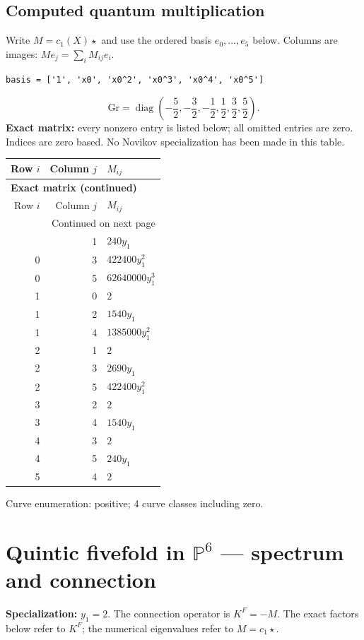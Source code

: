 \documentclass[10pt,a4paper]{article}
\begin{document}
\subsection*{Computed quantum multiplication}
Write $M=c_1(X)\star$ and use the ordered basis $e_0,\ldots,e_{5}$ below. Columns are images: $M e_j=\sum_i M_{ij}e_i$.
\begin{lstlisting}
basis = ['1', 'x0', 'x0^2', 'x0^3', 'x0^4', 'x0^5']
\end{lstlisting}
\[\mathrm{Gr}=\operatorname{diag}\!\left(- \frac{5}{2},- \frac{3}{2},- \frac{1}{2},\frac{1}{2},\frac{3}{2},\frac{5}{2}\right).\]
\textbf{Exact matrix:} every nonzero entry is listed below; all omitted entries are zero. Indices are zero based. No Novikov specialization has been made in this table.
{\small\setlength{\tabcolsep}{7pt}\begin{longtable}{rrp{125mm}}
\toprule Row $i$ & Column $j$ & $M_{ij}$\\\midrule\endfirsthead
\multicolumn{3}{l}{\textbf{Exact matrix (continued)}}\\
\toprule Row $i$ & Column $j$ & $M_{ij}$\\\midrule\endhead
\midrule\multicolumn{3}{r}{Continued on next page}\\\endfoot\bottomrule\endlastfoot
0 & 1 & $240 y_{1}$\\
0 & 3 & $422400 y_{1}^{2}$\\
0 & 5 & $62640000 y_{1}^{3}$\\
1 & 0 & $2$\\
1 & 2 & $1540 y_{1}$\\
1 & 4 & $1385000 y_{1}^{2}$\\
2 & 1 & $2$\\
2 & 3 & $2690 y_{1}$\\
2 & 5 & $422400 y_{1}^{2}$\\
3 & 2 & $2$\\
3 & 4 & $1540 y_{1}$\\
4 & 3 & $2$\\
4 & 5 & $240 y_{1}$\\
5 & 4 & $2$\\
\end{longtable}}
Curve enumeration: positive; 4 curve classes including zero.
\clearpage\section*{Quintic fivefold in $\mathbb P^{6}$ --- spectrum and connection}
\textbf{Specialization:} $y_1=2$. The connection operator is $K^F=-M$. The exact factors below refer to $K^F$; the numerical eigenvalues refer to $M=c_1\star$.
\end{document}
